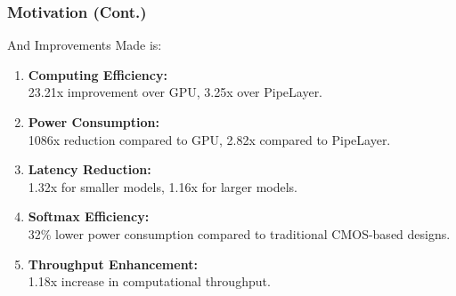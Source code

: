 \documentclass[
	12pt, %
]{beamer}
\begin{document}
%	
%		
%		
%		
%		



\begin{frame}
	\frametitle{Motivation (Cont.)}
	
	And Improvements Made is:
	\begin{enumerate}
		\item
		\textbf{Computing Efficiency: }\\
		23.21x improvement over GPU, 3.25x over PipeLayer.
		
		\item 
		\textbf{Power Consumption:}\\
		1086x reduction compared to GPU, 2.82x compared to PipeLayer.
		
		\item 
		\textbf{Latency Reduction:}\\
		1.32x for smaller models, 1.16x for larger models.
		
		\item 
		\textbf{Softmax Efficiency:}\\
		32\% lower power consumption compared to traditional CMOS-based designs.
		
		\item 
		\textbf{Throughput Enhancement:}\\
		1.18x increase in computational throughput.
	\end{enumerate}
\end{frame}
\end{document}
